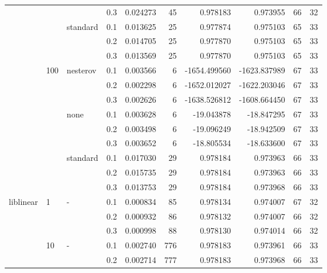 \begin{table}[h!]
\begin{tabular}{llllrrrrrr}
          &     &   & 0.3 &  0.024273 &      45 &     0.978183 &     0.973955 &          66 &        32 \\
          &     & standard & 0.1 &  0.013625 &      25 &     0.977874 &     0.975103 &          65 &        33 \\
          &     &   & 0.2 &  0.014705 &      25 &     0.977870 &     0.975103 &          65 &        33 \\
          &     &   & 0.3 &  0.013569 &      25 &     0.977870 &     0.975103 &          65 &        33 \\
          & 100 & nesterov & 0.1 &  0.003566 &       6 & -1654.499560 & -1623.837989 &          67 &        33 \\
          &     &   & 0.2 &  0.002298 &       6 & -1652.012027 & -1622.203046 &          67 &        33 \\
          &     &   & 0.3 &  0.002626 &       6 & -1638.526812 & -1608.664450 &          67 &        33 \\
          &     & none & 0.1 &  0.003628 &       6 &   -19.043878 &   -18.847295 &          67 &        33 \\
          &     &   & 0.2 &  0.003498 &       6 &   -19.096249 &   -18.942509 &          67 &        33 \\
          &     &   & 0.3 &  0.003652 &       6 &   -18.805534 &   -18.633600 &          67 &        33 \\
          &     & standard & 0.1 &  0.017030 &      29 &     0.978184 &     0.973963 &          66 &        33 \\
          &     &   & 0.2 &  0.015735 &      29 &     0.978184 &     0.973963 &          66 &        33 \\
          &     &   & 0.3 &  0.013753 &      29 &     0.978184 &     0.973968 &          66 &        33 \\
liblinear & 1   & - & 0.1 &  0.000834 &      85 &     0.978134 &     0.974007 &          67 &        32 \\
          &     &   & 0.2 &  0.000932 &      86 &     0.978132 &     0.974007 &          66 &        32 \\
          &     &   & 0.3 &  0.000998 &      88 &     0.978130 &     0.974014 &          66 &        32 \\
          & 10  & - & 0.1 &  0.002740 &     776 &     0.978183 &     0.973961 &          66 &        33 \\
          &     &   & 0.2 &  0.002714 &     777 &     0.978183 &     0.973968 &          66 &        33 \\

\end{tabular}
\end{table}
